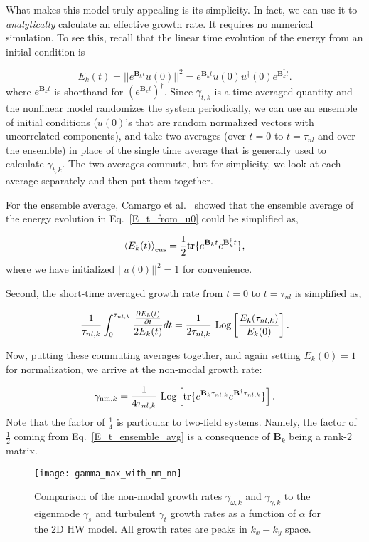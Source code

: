 \documentclass[twocolumn,showkeys,superscriptaddress]{revtex4}
\def\beq{\begin{equation}}
\def\eeq{\end{equation}}
\newcommand{\pdiff}[2]{\frac{\partial#1}{\partial#2}}
\begin{document}
What makes this model truly appealing is its simplicity. In fact, we can use it to \emph{analytically} calculate an effective growth rate. It requires no numerical simulation.
To see this, recall that the linear time evolution of the energy from an initial condition is

\beq
\label{E_t_from_u0}
E_k(t) = ||e^{\mathbf{B}_k t} u(0)||^2 = e^{\mathbf{B}_k t} u(0) u^{\dagger}(0) e^{\mathbf{B}_k^{\dagger}t}.
\eeq
where $e^{\mathbf{B}_k^{\dagger}t}$ is shorthand for $\left( e^{\mathbf{B}_k t} \right)^{\dagger}$.
Since $\gamma_{t,k}$ is a time-averaged quantity and the nonlinear model randomizes the system periodically, we can use an ensemble of initial conditions ($u(0)$'s that are random normalized vectors with uncorrelated components),
and take two averages (over $t=0$ to $t = \tau_{nl}$ and over the ensemble) in place of the single time average that is generally used to calculate $\gamma_{t,k}$. The two averages commute, but for simplicity, 
we look at each average separately and then put them together.

For the ensemble average, Camargo et al.~\cite{camargo1998,friedman2014} showed that the ensemble average of the energy evolution in Eq.~\ref{E_t_from_u0} could be simplified as,

\beq
\label{E_t_ensemble_avg}
\left< E_k(t) \right>_{{\rm{ens}}} = \frac{1}{2} {\rm{tr}} \{ e^{\mathbf{B}_k t} e^{\mathbf{B}_k^{\dagger}t} \},
\eeq
where we have initialized $||u(0)||^2 = 1$ for convenience.

Second, the short-time averaged growth rate from $t=0$ to $t = \tau_{nl}$ is simplified as,

\beq
\label{gamma_nm_calc}
\frac{1}{\tau_{nl,k}} \int_0^{\tau_{nl,k}} \frac{\pdiff{E_k(t)}{t}}{2 E_k(t)} dt = \frac{1}{2 \tau_{nl,k}} \ {\rm{Log}} \left[ \frac{E_k(\tau_{nl,k})}{E_k(0)}\right].
\eeq

Now, putting these commuting averages together, and again setting $E_k(0) = 1$ for normalization, we arrive at the non-modal growth rate:

\beq
\label{gamma_nm}
\gamma_{{\rm{nm}},k} = \frac{1}{4 \tau_{nl,k}} \ {\rm{Log}} \left[ {\rm{tr}} \{ e^{\mathbf{B}_k \tau_{nl,k}} e^{\mathbf{B}^{\dagger} \tau_{nl,k}} \} \right].
\eeq
Note that the factor of $\frac{1}{4}$ is particular to two-field systems. Namely, the factor of $\frac{1}{2}$ coming from Eq.~\ref{E_t_ensemble_avg} is a consequence of $\mathbf{B}_k$ being a rank-$2$ matrix.

\begin{figure}
\centerline{\texttt{[image: gamma\_max\_with\_nm\_nn]}}
\caption{Comparison of the non-modal growth rates $\gamma_{\omega,k}$ and $\gamma_{\gamma,k}$ to the eigenmode $\gamma_{s}$ and turbulent $\gamma_{t}$ growth rates as a function of $\alpha$ for the 2D HW model. 
All growth rates are peaks in $k_x-k_y$ space.}
\label{gamma_max_with_nm}
\end{figure}
\end{document}
